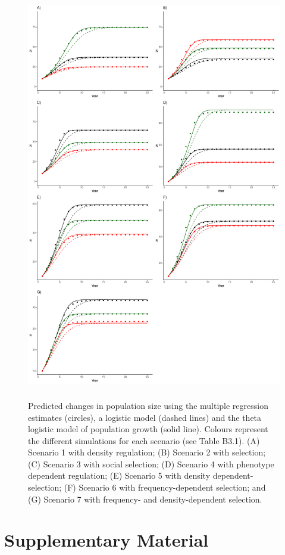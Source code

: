 \documentclass{article}
\begin{document}
 \begin{figure}[H] 
 	\centering
 	\includegraphics[width=12cm, height=18cm]{Figures/FigS4.pdf}
 	\caption{Predicted changes in population size using the multiple regression estimates (circles), a logistic model (dashed lines) and the theta logistic model of population growth (solid line). Colours represent the different simulations for each scenario (see Table B3.1). (A) Scenario 1 with density regulation; (B) Scenario 2 with selection; (C) Scenario 3 with social selection; (D) Scenario 4 with phenotype dependent regulation; (E) Scenario 5 with density dependent-selection; (F) Scenario 6 with frequency-dependent selection; and (G) Scenario 7 with frequency- and density-dependent selection.} 
 	\label{fig:growth}
 \end{figure}
 
 \section{Supplementary Material}
\end{document}
